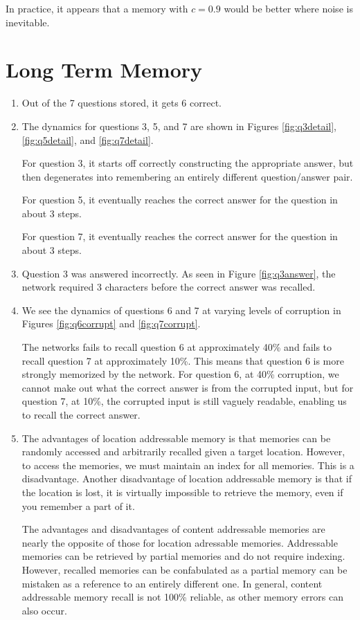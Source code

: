 \documentclass[11pt, oneside]{article}
\begin{document}
In practice, it appears that a memory with $c = 0.9$ would be better where noise is inevitable.

\section{Long Term Memory}

\begin{enumerate}
  \item Out of the 7 questions stored, it gets 6 correct.

  \item The dynamics for questions 3, 5, and 7 are shown in Figures \ref{fig:q3detail}, \ref{fig:q5detail}, and \ref{fig:q7detail}.

  For question 3, it starts off correctly constructing the appropriate answer, but then degenerates into remembering an entirely different question/answer pair.

  For question 5, it eventually reaches the correct answer for the question in about 3 steps.

  For question 7, it eventually reaches the correct answer for the question in about 3 steps.

  \item Question 3 was answered incorrectly. As seen in Figure \ref{fig:q3answer}, the network required 3 characters before the correct answer was recalled.

  \item We see the dynamics of questions 6 and 7 at varying levels of corruption in Figures \ref{fig:q6corrupt} and \ref{fig:q7corrupt}.

  The networks fails to recall question 6 at approximately 40\% and fails to recall question 7 at approximately 10\%. This means that question 6 is more strongly memorized by the network. For question 6, at 40\% corruption, we cannot make out what the correct answer is from the corrupted input, but for question 7, at 10\%, the corrupted input is still vaguely readable, enabling us to recall the correct answer.

  \item The advantages of location addressable memory is that memories can be randomly accessed and arbitrarily recalled given a target location. However, to access the memories, we must maintain an index for all memories. This is a disadvantage. Another disadvantage of location addressable memory is that if the location is lost, it is virtually impossible to retrieve the memory, even if you remember a part of it.

  The advantages and disadvantages of content addressable memories are nearly the opposite of those for location adressable memories. Addressable memories can be retrieved by partial memories and do not require indexing. However, recalled memories can be confabulated as a partial memory can be mistaken as a reference to an entirely different one. In general, content addressable memory recall is not 100\% reliable, as other memory errors can also occur.


\end{enumerate}
\end{document}
